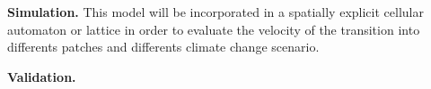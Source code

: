 \textbf{Simulation.} This model will be incorporated in a spatially explicit cellular automaton or lattice in
order to evaluate the velocity of the transition into differents patches and differents
climate change scenario.


\textbf{Validation.} 


\newpage






% 		
